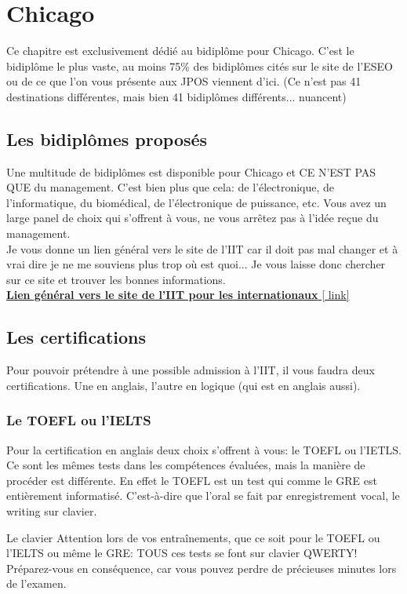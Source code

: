 \chapter{Chicago}\label{ch:ch2label}

Ce chapitre est exclusivement dédié au bidiplôme pour Chicago. C’est le bidiplôme le plus vaste, au moins 75\% des bidiplômes cités sur le site de l’ESEO ou de ce que l’on vous présente aux JPOS viennent d’ici. (Ce n’est pas 41 destinations différentes, mais bien 41 bidiplômes différents... nuancent)

\section{Les bidiplômes proposés}\label{sec:sec2.1}
Une multitude de bidiplômes est disponible pour Chicago et CE N'EST PAS QUE du management. C’est bien plus que cela: de l’électronique, de l’informatique, du biomédical, de l’électronique de puissance, etc. Vous avez un large panel de choix qui s’offrent à vous, ne vous arrêtez pas à l’idée reçue du management. \\
Je vous donne un lien général vers le site de l'IIT car il doit pas mal changer et à vrai dire je ne me souviens plus trop où est quoi... Je vous laisse donc chercher sur ce site et trouver les bonnes informations.\\
\href{https://admissions.iit.edu/graduate/apply/degree-seeking-checklist}{\textbf{Lien général vers le site de l'IIT pour les internationaux} [ link]}

\section{Les certifications}\label{sec:sec2.2}
Pour pouvoir prétendre à une possible admission à l’IIT, il vous faudra deux certifications. Une en anglais, l’autre en logique (qui est en anglais aussi).

\subsection{Le TOEFL ou l’IELTS}\label{sec:sec2.2.1}
Pour la certification en anglais deux choix s’offrent à vous: le TOEFL ou l’IETLS. Ce sont les mêmes tests dans les compétences évaluées, mais la manière de procéder est différente. En effet le TOEFL est un test qui comme le GRE est entièrement informatisé. C’est-à-dire que l’oral se fait par enregistrement vocal, le writing sur clavier.

\begin{example}{Le clavier}
  Attention lors de vos entraînements, que ce soit pour le TOEFL ou l’IELTS ou même le GRE: TOUS ces tests se font sur clavier QWERTY!
  Préparez-vous en conséquence, car vous pouvez perdre de précieuses minutes lors de l’examen.
\end{example}

